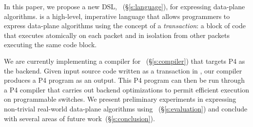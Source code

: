 In this paper, we propose a new DSL, \pktlanguage~(\S\ref{s:language}), for
expressing data-plane algorithms. \pktlanguage is a high-level, imperative
language that allows programmers to express data-plane algorithms using the
concept of a {\em transaction}: a block of code that executes atomically on
each packet and in isolation from other packets executing the same code block.

%

We are currently implementing a compiler for \pktlanguage~(\S\ref{s:compiler})
that targets P4 as the backend. Given input source code written as a
transaction in \pktlanguage, our compiler produces a P4 program as an output.
This P4 program can then be run through a P4 compiler that carries out backend
optimizations to permit efficient execution on programmable switches.  We
present preliminary experiments in expressing non-trivial real-world data-plane
algorithms using \pktlanguage~(\S\ref{s:evaluation}) and conclude with several
areas of future work~(\S\ref{s:conclusion}).
